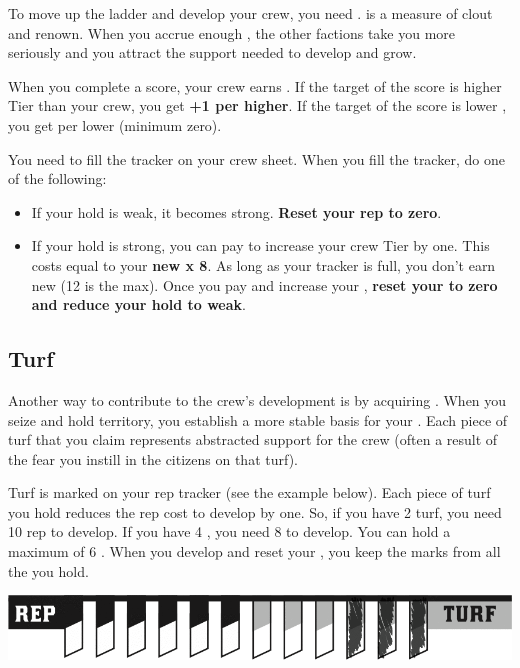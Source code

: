 To move up the ladder and develop your crew, you need .  is a measure of clout and renown. When you accrue enough , the other factions take you more seriously and you attract the support needed to develop and grow.

When you complete a score, your crew earns . If the target of the score is higher Tier than your crew, you get \textbf{+1  per  higher}. If the target of the score is lower , you get  per  lower (minimum zero).

You need  to fill the  tracker on your crew sheet. When you fill the tracker, do one of the following:

\begin{itemize}
\item If your hold is weak, it becomes strong. \textbf{Reset your rep to zero}.
\item If your hold is strong, you can pay to increase your crew Tier by one. This costs  equal to your \textbf{new  x 8}. As long as your  tracker is full, you don’t earn new  (12 is the max). Once you pay and increase your , \textbf{reset your  to zero and reduce your hold to weak}.
\end{itemize}

\subsection{Turf}

Another way to contribute to the crew’s development is by acquiring . When you seize and hold territory, you establish a more stable basis for your . Each piece of turf that you claim represents abstracted support for the crew (often a result of the fear you instill in the citizens on that turf).

Turf is marked on your rep tracker (see the example below). Each piece of turf you hold reduces the rep cost to develop by one. So, if you have 2 turf, you need 10 rep to develop. If you have 4 , you need 8  to develop. You can hold a maximum of 6 . When you develop and reset your , you keep the marks from all the  you hold.

\begin{center}\includegraphics[scale=0.2]{img/turf.png}\end{center}

